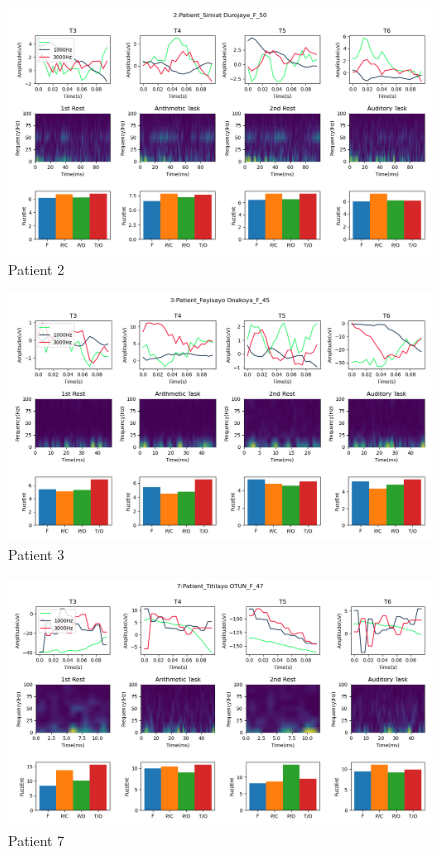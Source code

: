 \documentclass[conference]{IEEEconf}
\begin{document}
\clearpage
\begin{figure}
  \includegraphics[width=\textwidth]{../../data_analysis_results/results/Patient/2.png}
  \caption{Patient 2}
  \label{fig:patient_2}
\end{figure}
\clearpage
\begin{figure}
  \includegraphics[width=\textwidth]{../../data_analysis_results/results/Patient/3.png}
  \caption{Patient 3}
  \label{fig:patient_3}
\end{figure}
\clearpage
\begin{figure}
  \includegraphics[width=\textwidth]{../../data_analysis_results/results/Patient/7.png}
  \caption{Patient 7}
  \label{fig:patient_7}
\end{figure}
\end{document}
